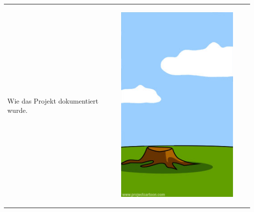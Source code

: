 \begin{tabularx}{\textwidth}{XXXX}
\begin{minipage}[t]{0.23\textwidth}
\begin{center}
Wie das Projekt dokumentiert wurde.
\end{center}
\end{minipage}
&
\begin{minipage}[t]{0.23\textwidth}
\begin{center}
\includegraphics[width=1.0\textwidth]{./inf/SEKII/29_Softwaretechnik/PM_08.jpg}


\end{center}
\end{minipage}
\end{tabularx}
